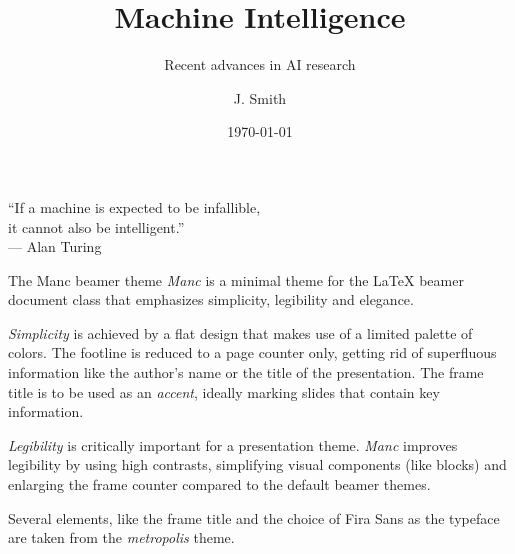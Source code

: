 \documentclass[compress,aspectratio=1610]{beamer}
\title{Machine Intelligence}
\subtitle{Recent advances in AI research}
\date{\today}
\author{J. Smith}
\institute{Institute of Advanced Robotics}
\begin{document}
\begin{frame}
  \titlepage
\end{frame}

\begin{frame}
  \centering
  \begin{tcolorbox}[
    before skip=30mm,
    after skip=30mm,
    boxrule=2pt,
    sharp corners,
    fonttitle=\usebeamerfont{block title},
    fontupper=\usebeamerfont{block body},
    fontlower=\usebeamerfont{block body},
    boxsep=.5mm,
    parbox=false,
    width=30em,
  ]
    \enquote{If a machine is expected to be infallible,\\[-0.5ex] it cannot also be intelligent.}\\
    \hfill \textup{— Alan Turing}
  \end{tcolorbox}
\end{frame}

\begin{frame}{The Manc beamer theme}
  \emph{Manc} is a minimal theme for the \LaTeX{} beamer document class that emphasizes simplicity, legibility and elegance.

  \emph{Simplicity} is achieved by a flat design that makes use of a limited palette of colors. The footline is reduced to a page counter only, getting rid of superfluous information like the author's name or the title of the presentation.
  The frame title is to be used as an \emph{accent}, ideally marking slides that contain key information.

  \emph{Legibility} is critically important for a presentation theme.
  \emph{Manc} improves legibility by using high contrasts, simplifying visual components (like blocks) and enlarging the frame counter compared to the default beamer themes.

  Several elements, like the frame title and the choice of Fira Sans as the typeface are taken from the \emph{metropolis} theme.
\end{frame}
\end{document}
